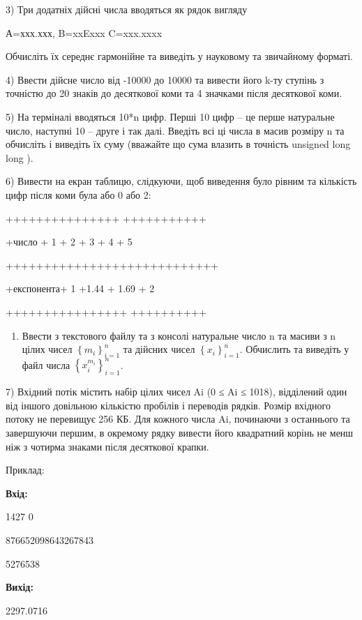 \documentclass[]{article}
\begin{document}
3) Три додатніх дійсні числа вводяться як рядок вигляду

А=ххх.ххх, B=xxExxx C=xxx.xxxx

Обчисліть їх середнє гармонійне та виведіть у науковому та звичайному
форматі.

4) Ввести дійсне число від -10000 до 10000 та вивести його k-ту ступінь
з точністю до 20 знаків до десяткової коми та 4 значками після
десяткової коми.

5) \protect\hypertarget{_Hlk65238442}{}{}На терміналі вводяться 10*n
цифр. Перші 10 цифр -- це перше натуральне число, наступні 10 -- друге і
так далі. Введіть всі ці числа в масив розміру n та обчисліть і виведіть
їх суму (вважайте що сума влазить в точність unsigned long long ).

6) Вивести на екран таблицю, слідкуючи, щоб виведення було рівним та
кількість цифр після коми була або 0 або 2:

+++++++++++++++ +++++++++++

+число + 1 + 2 + 3 + 4 + 5

++++++++++++++++++++++++++++

+експонента+ 1 +1.44 + 1.69 + 2

++++++++++++++++ ++++++++++

\begin{enumerate}
\def\labelenumi{\arabic{enumi})}
\item
  Ввести з текстового файлу та з консолі натуральне число n та масиви з
  n цілих чисел \(\left\{ m_{i} \right\}_{i = 1}^{n}\) та дійсних чисел
  \(\left\{ x_{i} \right\}_{i = 1}^{n}\). Обчислить та виведіть у файл
  числа \(\left\{ x_{i}^{m_{i}} \right\}_{i = 1}^{n}\).
\end{enumerate}

7) \protect\hypertarget{_Hlk65238464}{}{}Вхідний потік містить набір
цілих чисел Ai (0 ≤ Ai ≤ 1018), відділений один від іншого довільною
кількістю пробілів і переводів рядків. Розмір вхідного потоку не
перевищує 256 КБ. Для кожного числа Ai, починаючи з останнього та
завершуючи першим, в окремому рядку вивести його квадратний корінь не
менш ніж з чотирма знаками після десяткової крапки.

Приклад:

\textbf{Вхід:}

1427 0

876652098643267843

5276538

\textbf{Вихід: }

2297.0716
\end{document}
